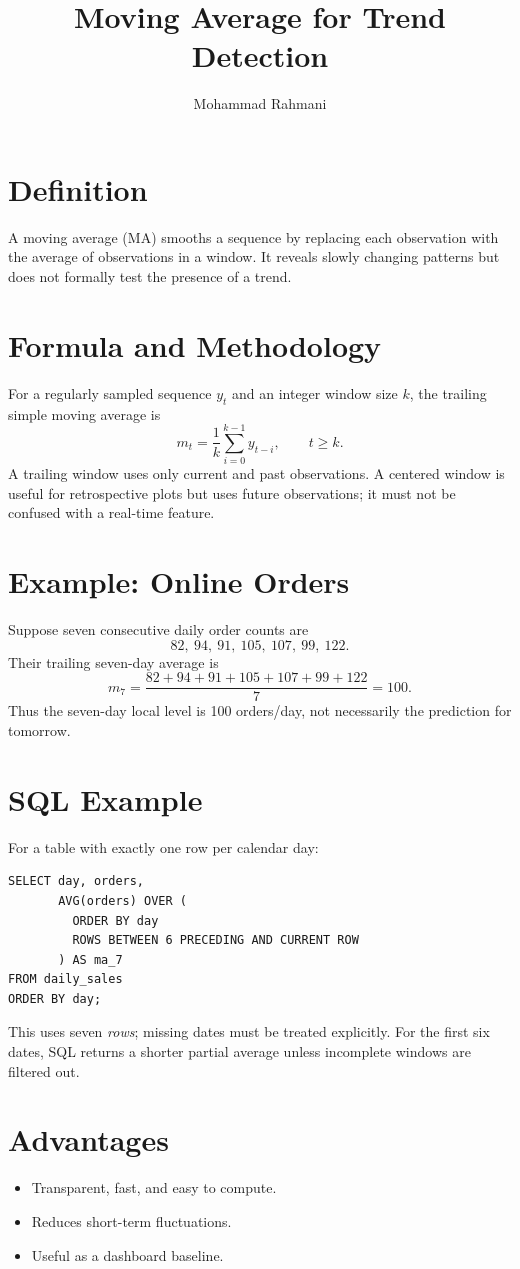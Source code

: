 \documentclass[a4paper]{article}
\title{Moving Average for Trend Detection}
\date{}
\author{Mohammad Rahmani}
\begin{document}
\maketitle

\section{Definition}
A moving average (MA) smooths a sequence by replacing each observation with the average of observations in a window. It reveals slowly changing patterns but does not formally test the presence of a trend.

\section{Formula and Methodology}
For a regularly sampled sequence $y_t$ and an integer window size $k$, the trailing simple moving average is
\[
 m_t = \frac{1}{k}\sum_{i=0}^{k-1} y_{t-i},\qquad t\ge k.
\]
A trailing window uses only current and past observations. A centered window is useful for retrospective plots but uses future observations; it must not be confused with a real-time feature.

\section{Example: Online Orders}
Suppose seven consecutive daily order counts are
\[
 82,\ 94,\ 91,\ 105,\ 107,\ 99,\ 122.
\]
Their trailing seven-day average is
\[
 m_7 = \frac{82+94+91+105+107+99+122}{7}=100.
\]
Thus the seven-day local level is 100 orders/day, not necessarily the prediction for tomorrow.

\section{SQL Example}
For a table with exactly one row per calendar day:
\begin{verbatim}
SELECT day, orders,
       AVG(orders) OVER (
         ORDER BY day
         ROWS BETWEEN 6 PRECEDING AND CURRENT ROW
       ) AS ma_7
FROM daily_sales
ORDER BY day;
\end{verbatim}
This uses seven \emph{rows}; missing dates must be treated explicitly. For the first six dates, SQL returns a shorter partial average unless incomplete windows are filtered out.

\section{Advantages}
\begin{itemize}
 \item Transparent, fast, and easy to compute.
 \item Reduces short-term fluctuations.
 \item Useful as a dashboard baseline.
\end{itemize}
\end{document}
